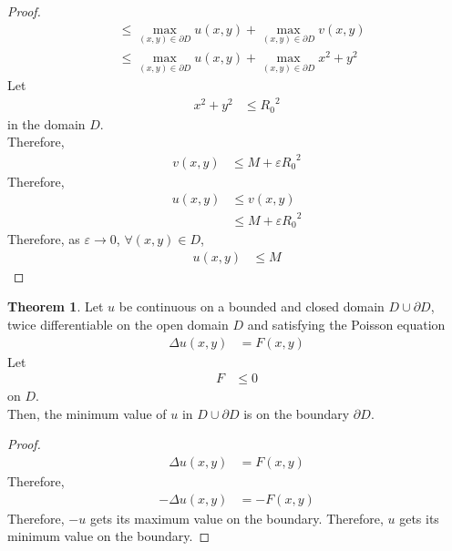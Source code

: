\documentclass[titlepage, fleqn, a4paper, 12pt, twoside]{article}
\theoremstyle{definition}
\theoremstyle{theorem}
\newtheorem{theorem}{Theorem}
\begin{document}
\begin{proof}
\begin{align*}
                       & \le \max\limits_{(x,y) \in \partial D} u(x,y) + \max\limits_{(x,y) \in \partial D} v(x,y) \\
                       & \le \max\limits_{(x,y) \in \partial D} u(x,y) + \max\limits_{(x,y) \in \partial D} x^2 + y^2
	\end{align*}
	Let
	\begin{align*}
		x^2 + y^2 & \le {R_0}^2
	\end{align*}
	in the domain $D$.\\
	Therefore,
	\begin{align*}
		v(x,y) & \le M + \varepsilon {R_0}^2
	\end{align*}
	Therefore,
	\begin{align*}
		u(x,y) & \le v(x,y) \\
                       & \le M + \varepsilon {R_0}^2
	\end{align*}
	Therefore, as $\varepsilon \to 0$, $\forall (x,y) \in D$,
	\begin{align*}
		u(x,y) & \le M
	\end{align*}
\end{proof}

\begin{theorem}
	Let $u$ be continuous on a bounded and closed domain $D \cup \partial D$, twice differentiable on the open domain $D$ and satisfying the Poisson equation
	\begin{align*}
		\Delta u(x,y) & = F(x,y)
	\end{align*}
	Let
	\begin{align*}
		F & \le 0
	\end{align*}
	on $D$.\\
	Then, the minimum value of $u$ in $D \cup \partial D$ is on the boundary $\partial D$.
\end{theorem}

\begin{proof}
	\begin{align*}
		\Delta u(x,y) & = F(x,y)
	\end{align*}
	Therefore,
	\begin{align*}
		-\Delta u(x,y) & = -F(x,y)
	\end{align*}
	Therefore, $-u$ gets its maximum value on the boundary.
	Therefore, $u$ gets its minimum value on the boundary.
\end{proof}
\end{document}
